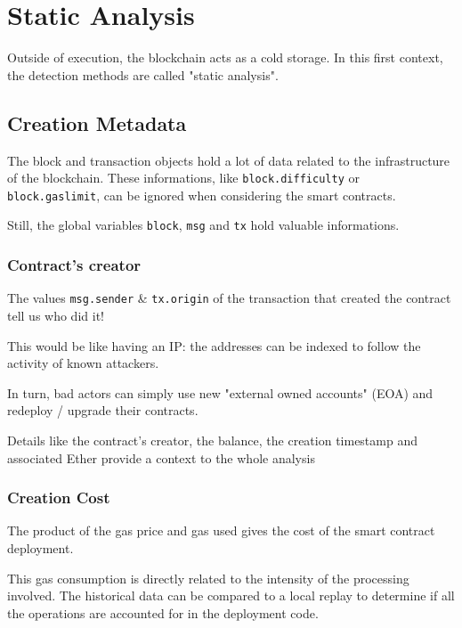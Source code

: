 \section{Static Analysis} \label{sec:data-static}

Outside of execution, the blockchain acts as a cold storage.
In this first context, the detection methods are called "static analysis".

\subsection{Creation Metadata}

The block and transaction objects hold a lot of data related to the infrastructure of the blockchain.
These informations, like \lstinline[language=Solidity]{block.difficulty} or \lstinline[language=Solidity]{block.gaslimit}, can be ignored when considering the smart contracts.

Still, the global variables \lstinline[language=Solidity]{block}, \lstinline[language=Solidity]{msg} and \lstinline[language=Solidity]{tx} hold valuable informations.

\subsubsection{Contract's creator}

The values \lstinline[language=Solidity]{msg.sender} \& \lstinline[language=Solidity]{tx.origin} of the transaction that created the contract tell us who did it!

This would be like having an IP: the addresses can be indexed to follow the activity of known attackers.

In turn, bad actors can simply use new "external owned accounts" (EOA) and redeploy / upgrade their contracts.

Details like the contract's creator, the balance, the creation timestamp and associated Ether provide a context to the whole analysis

\subsubsection{Creation Cost}

The product of the gas price and gas used gives the cost of the smart contract deployment.

This gas consumption is directly related to the intensity of the processing involved.
The historical data can be compared to a local replay to determine if all the operations are accounted for in the deployment code.

